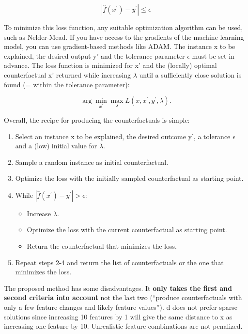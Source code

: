 \documentclass[
  11pt,
]{scrbook}
\providecommand{\tightlist}{%
  \setlength{\itemsep}{0pt}\setlength{\parskip}{0pt}}
\begin{document}
\[|\hat{f}(x^\prime)-y^\prime|\leq\epsilon\]

To minimize this loss function, any suitable optimization algorithm can be used, such as Nelder-Mead.
If you have access to the gradients of the machine learning model, you can use gradient-based methods like ADAM.
The instance x to be explained, the desired output y' and the tolerance parameter \(\epsilon\) must be set in advance.
The loss function is minimized for x' and the (locally) optimal counterfactual x' returned while increasing \(\lambda\) until a sufficiently close solution is found (= within the tolerance parameter):

\[\arg\min_{x^\prime}\max_{\lambda}L(x,x^\prime,y^\prime,\lambda).\]

Overall, the recipe for producing the counterfactuals is simple:

\begin{enumerate}
\def\labelenumi{\arabic{enumi}.}
\tightlist
\item
  Select an instance x to be explained, the desired outcome y', a tolerance \(\epsilon\) and a (low) initial value for \(\lambda\).
\item
  Sample a random instance as initial counterfactual.
\item
  Optimize the loss with the initially sampled counterfactual as starting point.
\item
  While \(|\hat{f}(x^\prime)-y^\prime|>\epsilon\):

  \begin{itemize}
  \tightlist
  \item
    Increase \(\lambda\).
  \item
    Optimize the loss with the current counterfactual as starting point.
  \item
    Return the counterfactual that minimizes the loss.
  \end{itemize}
\item
  Repeat steps 2-4 and return the list of counterfactuals or the one that minimizes the loss.
\end{enumerate}

The proposed method has some disadvantages.
It \textbf{only takes the first and second criteria into account} not the last two (``produce counterfactuals with only a few feature changes and likely feature values'').
d does not prefer sparse solutions since increasing 10 features by 1 will give the same distance to x as increasing one feature by 10.
Unrealistic feature combinations are not penalized.
\end{document}
